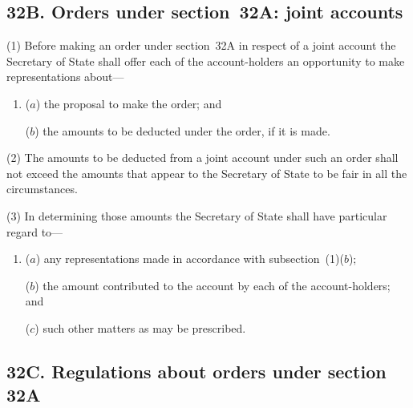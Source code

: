 \documentclass[12pt,a4paper]{article}
\begin{document}

\subsection{32B. Orders under section~32A: joint accounts}

(1) Before making an order under section~32A in respect of a joint account 
the 
Secretary of State  %
shall offer each of the account-holders an opportunity to make representations about---
\begin{enumerate}\item[]
($a$) the proposal to make the order; and

($b$) the amounts to be deducted under the order, if it is made.
\end{enumerate}

(2)
The amounts to be deducted from a joint account under such an order shall not exceed the amounts that appear to the 
Secretary of State  %
to be fair in all the circumstances.

(3)
In determining those amounts the 
Secretary of State  %
shall have particular regard to---
\begin{enumerate}\item[]
($a$) any representations made in accordance with subsection~(1)($b$);

\begin{sloppypar}
($b$) the amount contributed to the account by each of the account-holders; and
\end{sloppypar}

($c$) such other matters as may be prescribed.
\end{enumerate}


\subsection{32C. Regulations about orders under section 32A}
\end{document}
